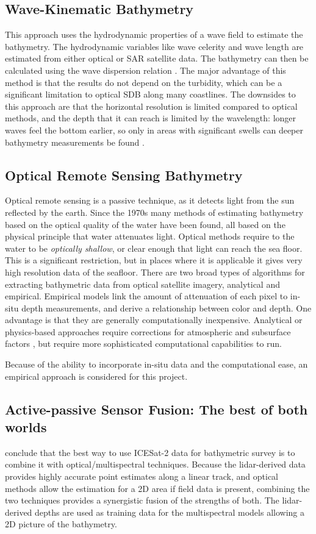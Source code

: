 \subsection{Wave-Kinematic Bathymetry}
This approach uses the hydrodynamic properties of a wave field to estimate the bathymetry. The hydrodynamic variables like wave celerity and wave length are estimated from either optical or SAR satellite data. The bathymetry can then be calculated using the wave dispersion relation \cite{Almar2021e}. The major advantage of this method is that the results do not depend on the turbidity, which can be a significant limitation to optical SDB along many coastlines. The downsides to this approach are that the horizontal resolution is limited compared to optical methods, and the depth that it can reach is limited by the wavelength: longer waves feel the bottom earlier, so only in areas with significant swells can deeper bathymetry measurements be found \parencite{Almar2021e}.

\subsection{Optical Remote Sensing Bathymetry}
Optical remote sensing is a passive technique, as it detects light from the sun reflected by the earth. Since the 1970s many methods of estimating bathymetry based on the optical quality of the water have been found, all based on the physical principle that water attenuates light. Optical methods require to the water to be \emph{optically shallow}, or clear enough that light can reach the sea floor. This is a significant restriction, but in places where it is applicable it gives very high resolution data of the seafloor. There are two broad types of algorithms for extracting bathymetric data from optical satellite imagery, analytical and empirical. Empirical models link the amount of attenuation of each pixel to in-situ depth measurements, and derive a relationship between color and depth. One advantage is that they are generally computationally inexpensive. Analytical or physics-based approaches require corrections for atmospheric and subsurface factors \parencite{Turner2021}, but require more sophisticated computational capabilities to run.

Because of the ability to incorporate in-situ data and the computational ease, an empirical approach is considered for this project.

\subsection{Active-passive Sensor Fusion: The best of both worlds}
\citeauthor{Parrish2019} conclude that the best way to use ICESat-2 data for bathymetric survey is to combine it with optical/multispectral techniques. Because the lidar-derived data provides highly accurate point estimates along a linear track, and optical methods allow the estimation for a 2D area if field data is present, combining the two techniques provides a synergistic fusion of the strengths of both. The lidar-derived depths are used as training data for the multispectral models allowing a 2D picture of the bathymetry.

